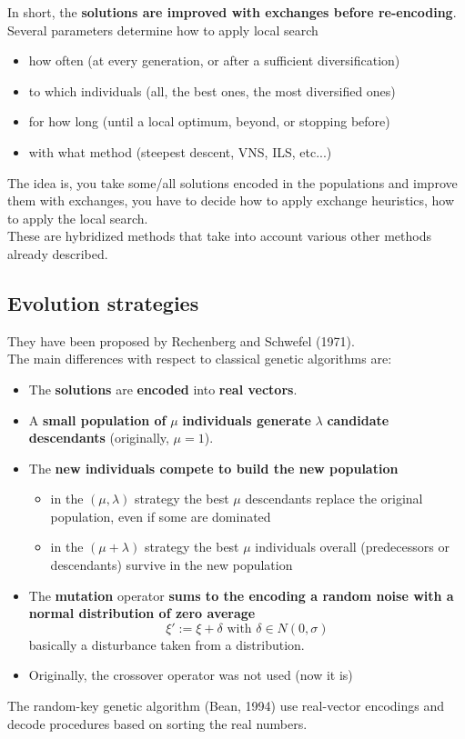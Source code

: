 In short, the \textbf{solutions are improved with exchanges before re-encoding}.\\

Several parameters determine how to apply local search
\begin{itemize}
	\item how often (at every generation, or after a sufficient diversification)
	\item to which individuals (all, the best ones, the most diversified ones)
	\item for how long (until a local optimum, beyond, or stopping before)
	\item with what method (steepest descent, VNS, ILS, etc...)
\end{itemize}

The idea is, you take some/all solutions encoded in the populations and improve them with exchanges, you have to decide how to apply exchange heuristics, how to apply the local search.\\
These are hybridized methods that take into account various other methods already described.\\

\newpage

\subsection{Evolution strategies}
They have been proposed by Rechenberg and Schwefel (1971).\\

The main differences with respect to classical genetic algorithms are:
\begin{itemize}
	\item The \textbf{solutions} are \textbf{encoded} into \textbf{real vectors}.\\
	
	\item A \textbf{small population of} $\mu$ \textbf{individuals generate} $\lambda$ \textbf{candidate descendants} (originally, $\mu = 1$).\\
	
	\item The \textbf{new individuals compete to build the new population}
	\begin{itemize}
		\item in the $(\mu, \lambda)$ strategy the best $\mu$ descendants replace the original population, even if some are dominated
		\item in the $(\mu + \lambda)$ strategy the best $\mu$ individuals overall (predecessors or descendants) survive in the new population
	\end{itemize}
	\nn
	
	\item The \textbf{mutation} operator \textbf{sums to the encoding a random noise with a normal distribution of zero average}
	$$ \xi' := \xi + \delta \text{ with } \delta \in N(0, \sigma) $$
	basically a disturbance taken from a distribution.\\
	
	\item Originally, the crossover operator was not used (now it is)
\end{itemize}

The random-key genetic algorithm (Bean, 1994) use real-vector encodings and decode procedures based on sorting the real numbers.\\

